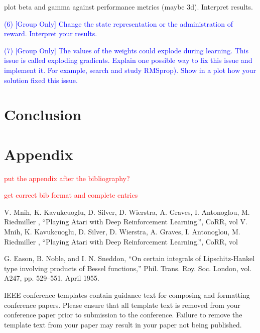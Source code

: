 \documentclass[conference]{IEEEtran}
\begin{document}
plot beta and gamma against performance metrics (maybe 3d). Interpret results.


\textcolor{blue}{(6) [Group Only] Change the state representation or the administration of reward. Interpret your results.}

\textcolor{blue}{(7) [Group Only] The values of the weights could explode during learning. This
issue is called exploding gradients. Explain one possible way to fix this issue and
implement it. For example, search and study RMSprop). Show in a plot how your
solution fixed this issue.}








\section{Conclusion}\label{sec:conclusion}



\section{Appendix}
\textcolor{red}{put the appendix after the bibliography?}




\textcolor{red}{get correct bib format and complete entries}
\begin{thebibliography}{00}
     V. Mnih, K. Kavukcuoglu, D. Silver, D. Wierstra, A. Graves, I. Antonoglou, M. Riedmiller , ``Playing Atari with Deep Reinforcement Learning.'', CoRR, vol
     V. Mnih, K. Kavukcuoglu, D. Silver, D. Wierstra, A. Graves, I. Antonoglou, M. Riedmiller , ``Playing Atari with Deep Reinforcement Learning.'', CoRR, vol

    \color{red}
     G. Eason, B. Noble, and I. N. Sneddon, ``On certain integrals of Lipschitz-Hankel type involving products of Bessel functions,'' Phil. Trans. Roy. Soc. London, vol. A247, pp. 529--551, April 1955.
\end{thebibliography}
\color{red}
\vspace{12pt}
IEEE conference templates contain guidance text for composing and formatting conference papers. Please ensure that all template text is removed from your conference paper prior to submission to the conference. Failure to remove the template text from your paper may result in your paper not being published.
\end{document}
